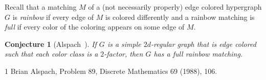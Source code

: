 \documentclass{article}
\newtheorem{conj}[thm]{Conjecture}
\begin{document}
\setcounter{section}{2}
\setcounter{thm}{11}
Recall that a matching $M$ of a (not necessarily properly) edge colored hypergraph $G$ is \emph{rainbow} if every edge of $M$ is colored differently and a rainbow matching is \emph{full} if every color of the coloring appears on some edge of $M$.

\begin{conj}[Alspach~\cite{A88}]\label{conj:Alspach}
If $G$ is a simple $2d$-regular graph that is edge colored such that each color class is a $2$-factor, then $G$ has a full rainbow matching.
\end{conj}

\begin{thebibliography}{1}
 Brian Alspach, Problem 89, Discrete Mathematics 69 (1988), 106.
\end{thebibliography}
\end{document}
